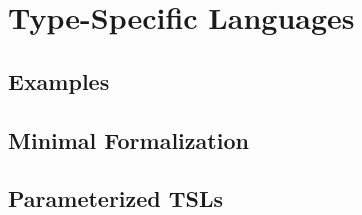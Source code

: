 \chapter{Type-Specific Languages}
\section{Examples}
\section{Minimal Formalization}
\section{Parameterized TSLs}
